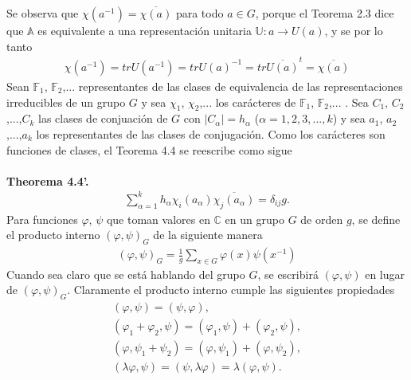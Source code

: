 \documentclass[12pt]{book}
\theoremstyle{definition}
\newcounter{in}
\begin{document}
Se observa que $\chi(a^{-1})=\overline{\chi(a)}$ para todo $a \in G$, porque el Teorema 2.3 dice que $\mathbb{A}$ es equivalente a una representación unitaria $\mathbb{U}: a \rightarrow U(a)$, y se por lo tanto
\begin{equation*}
\begin{aligned}
\chi(a^{-1})=trU(a^{-1})=trU(a)^{-1}=tr \overline{U(a)}^{t} = \overline{\chi(a)}  
\end{aligned}
\end{equation*} 
Sean $\mathbb{F}_{1}$, $\mathbb{F}_{2}$,... representantes de las clases de equivalencia de las representaciones irreducibles de un grupo $G$ y sea $\chi_{1}$, $\chi_{2}$,... los carácteres de $\mathbb{F}_{1}$, $\mathbb{F}_{2}$,... .  Sea $C_{1}$, $C_{2}$,...,$C_{k}$ las clases de conjuación de $G$ con $|C_{\alpha}|=h_{\alpha}$ ($\alpha=1, 2, 3,...,k$) y sea $a_{1}$, $a_{2}$,...,$a_{k}$ los representantes de las clases de conjugación. Como los carácteres son funciones de clases, el Teorema 4.4 se reescribe como sigue\\~\\
\textbf{Theorema 4.4'. }
\begin{equation*}
\begin{aligned} 
\sum_{\alpha=1}^{k} h_{\alpha} \chi_{i}(a_{\alpha}) \overline{\chi_{j}(a_{\alpha})} = \delta_{ij}g.
\end{aligned}
\end{equation*}
Para funciones $\varphi$, $\psi$ que toman valores en $\mathbb{C}$ en un grupo $G$ de orden $g$, se define el producto interno $(\varphi,\psi)_{G}$ de la siguiente manera
\begin{equation*}
\begin{aligned}
(\varphi,\psi)_{G} = \frac{1}{g} \sum_{x \in G} \varphi(x) \psi(x^{-1})
\end{aligned}
\end{equation*}
Cuando sea claro que se está hablando del grupo $G$, se escribirá $(\varphi,\psi)$ en lugar de $(\varphi,\psi)_{G}$. Claramente el producto interno cumple las siguientes propiedades
\begin{equation*}
\begin{aligned}
(\varphi,\psi)=(\psi,\varphi),\\
(\varphi_{1}+\varphi_{2},\psi)=(\varphi_{1},\psi)+(\varphi_{2},\psi),\\
(\varphi,\psi_{1}+\psi_{2})=(\varphi,\psi_{1})+(\varphi,\psi_{2}),\\
(\lambda \varphi,\psi)=(\psi,\lambda \varphi)=\lambda (\varphi,\psi).
\end{aligned}
\end{equation*}
\end{document}
